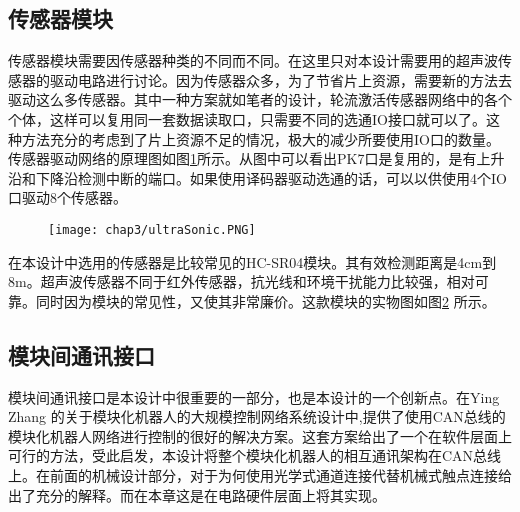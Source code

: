 \subsection{传感器模块}
传感器模块需要因传感器种类的不同而不同。在这里只对本设计需要用的超声波传感器的驱动电路进行讨论。因为传感器众多，为了节省片上资源，需要新的方法去驱动这么多传感器。其中一种方案就如笔者的设计，轮流激活传感器网络中的各个个体，这样可以复用同一套数据读取口，只需要不同的选通IO接口就可以了。这种方法充分的考虑到了片上资源不足的情况，极大的减少所要使用IO口的数量。传感器驱动网络的原理图如图\ref{fig.ultraSonic}所示。从图中可以看出PK7口是复用的，是有上升沿和下降沿检测中断的端口。如果使用译码器驱动选通的话，可以以供使用4个IO口驱动8个传感器。
\begin{figure}[!htp]\label{fig.ultraSonic}
  \centering
  \texttt{[image: chap3/ultraSonic.PNG]}
\end{figure}


在本设计中选用的传感器是比较常见的HC-SR04模块。其有效检测距离是4cm到8m。超声波传感器不同于红外传感器，抗光线和环境干扰能力比较强，相对可靠。同时因为模块的常见性，又使其非常廉价。这款模块的实物图如图\ref{fig.ultraSonicReal} 所示。 \\
\begin{figure}[!htp]\label{fig.ultraSonicReal}
  \centering
  \hspace{1in}
\end{figure}
\subsection{模块间通讯接口}
模块间通讯接口是本设计中很重要的一部分，也是本设计的一个创新点。在Ying Zhang 的关于模块化机器人的大规模控制网络系统设计中,提供了使用CAN总线的模块化机器人网络进行控制的很好的解决方案。这套方案给出了一个在软件层面上可行的方法，受此启发，本设计将整个模块化机器人的相互通讯架构在CAN总线上。在前面的机械设计部分，对于为何使用光学式通道连接代替机械式触点连接给出了充分的解释。而在本章这是在电路硬件层面上将其实现。

